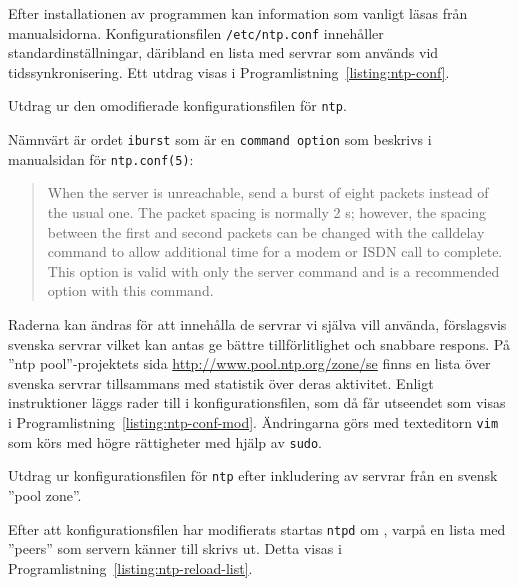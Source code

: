 Efter installationen av programmen kan information som vanligt läsas från
manualsidorna. Konfigurationsfilen \texttt{/etc/ntp.conf} innehåller
standardinställningar, däribland en lista med servrar som används vid
tidssynkronisering. Ett utdrag visas i Programlistning~\ref{listing:ntp-conf}.

\begin{listing}[H]
\caption[Omodifierad konfigurationsfil för \texttt{ntp}]{Utdrag ur den
         omodifierade konfigurationsfilen för \texttt{ntp}.}
\label{listing:ntp-conf}
\end{listing}

Nämnvärt är ordet \texttt{iburst} som är en \texttt{command option} som 
beskrivs i manualsidan för \texttt{ntp.conf(5)}:

\begin{quotation}
When  the  server  is  unreachable, send a burst of eight packets
instead of the usual one.  The packet spacing is normally 2 s; however, the
spacing between the first and second packets can be changed with the calldelay
command to allow additional time for a modem or ISDN call to  complete.   This
option is valid with only the server command and is a recommended option with
this command.
\end{quotation}


Raderna kan ändras för att innehålla de servrar vi själva vill använda,
förslagsvis svenska servrar vilket kan antas ge bättre tillförlitlighet och
snabbare respons. 
På ''ntp pool''-projektets sida \url{http://www.pool.ntp.org/zone/se} finns en
lista över svenska servrar tillsammans med statistik över deras aktivitet.
Enligt instruktioner \cite{ntp:pool-use} läggs rader till i
konfigurationsfilen, som då får utseendet som visas i
Programlistning~\ref{listing:ntp-conf-mod}.  Ändringarna görs med texteditorn
\texttt{vim} som körs med högre rättigheter med hjälp av \texttt{sudo}.

\begin{listing}[H]
\caption[Utdrag ur konfigurationsfilen för \texttt{ntp}]{Utdrag ur
         konfigurationsfilen för \texttt{ntp} efter inkludering av servrar 
         från en svensk ''pool zone''.}
\label{listing:ntp-conf-mod}
\end{listing}


Efter att konfigurationsfilen har modifierats startas \texttt{ntpd} om
\cite{ubuntu:ntp-serverguide}, varpå en lista med ''peers'' som servern känner
till skrivs ut. Detta visas i Programlistning~\ref{listing:ntp-reload-list}.

